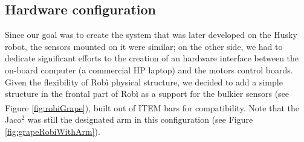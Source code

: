 \subsection{Hardware configuration}
Since our goal was to create the system that was later developed on the Husky robot, the sensors mounted on it were similar; on the other side, we had to dedicate significant efforts to the creation of an hardware interface between the on-board computer (a commercial HP laptop) and the motors control boards. Given the flexibility of Robì physical structure, we decided to add a simple structure in the frontal part of Robì as a support for the bulkier sensors (see Figure \ref{fig:robiGrape}), built out of ITEM\textsuperscript{\textregistered} bars for compatibility. Note that the Jaco$^2$ was still the designated arm in this configuration (see Figure \ref{fig:grapeRobiWithArm}).
